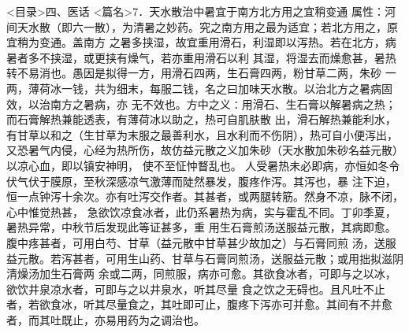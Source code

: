 \documentclass[a4paper,12pt,UTF8,twoside]{ctexbook}
\begin{document}
<目录>四、医话
<篇名>7．天水散治中暑宜于南方北方用之宜稍变通
属性：河间天水散（即六一散），为清暑之妙药。究之南方用之最为适宜；若北方用之，原宜稍为变通。盖南方 
之暑多挟湿，故宜重用滑石，利湿即以泻热。若在北方，病暑者多不挟湿，或更挟有燥气，若亦重用滑石以利 
其湿，将湿去而燥愈甚，暑热转不易消也。愚因是拟得一方，用滑石四两，生石膏四两，粉甘草二两，朱砂 
一两，薄荷冰一钱，共为细末，每服二钱，名之曰加味天水散。以治北方之暑病固效，以治南方之暑病，亦 
无不效也。方中之义∶用滑石、生石膏以解暑病之热；而石膏解热兼能透表，有薄荷冰以助之，热可自肌肤散 
出，滑石解热兼能利水，有甘草以和之（生甘草为末服之最善利水，且水利而不伤阴），热可自小便泻出， 
又恐暑气内侵，心经为热所伤，故仿益元散之义加朱砂（天水散加朱砂名益元散）以凉心血，即以镇安神明， 
使不至怔忡瞀乱也。 
人受暑热未必即病，亦恒如冬令伏气伏于膜原，至秋深感凉气激薄而陡然暴发，腹疼作泻。其泻也，暴 
注下迫，恒一点钟泻十余次。亦有吐泻交作者。其甚者，或两腿转筋。然身不凉，脉不闭，心中惟觉热甚， 
急欲饮凉食冰者，此仍系暑热为病，实与霍乱不同。丁卯季夏，暑热异常，中秋节后发现此等证甚多，重 
用生石膏煎汤送服益元散，其病即愈。腹中疼甚者，可用白芍、甘草（益元散中甘草甚少故加之）与石膏同煎 
汤，送服益元散。若泻甚者，可用生山药、甘草与石膏同煎汤，送服益元散；或用拙拟滋阴清燥汤加生石膏两 
余或二两，同煎服，病亦可愈。其欲食冰者，可即与之以冰，欲饮井泉凉水者，可即与之以井泉水，听其尽量 
食之饮之无碍也。且凡吐不止者，若欲食冰，听其尽量食之，其吐即可止，腹疼下泻亦可并愈。其间有不并愈 
者，而其吐既止，亦易用药为之调治也。 
\end{document}
